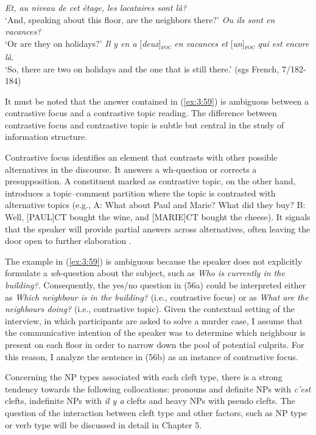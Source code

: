  \ea \label{ex:3:59}
\ea	\textit{Et, au niveau de cet étage, les locataires sont là?}\\
 ‘And, speaking about this floor, are the neighbors there?'
  \textit{Ou ils sont en vacances?}\\
 ‘Or are they on holidays?'
\ex \textit{Il y en a} {[\textit{deux}]\textsubscript{\textsc{foc}}} \normalsize \textit{en vacances et} {[\textit{un}]\textsubscript{\textsc{foc}}}  \textit{qui est encore là}.  \\
‘So, there are two on holidays and the one that is still there.' \hfill (sgs French, 7/182-184)    
\z \z 


It must be noted that the answer contained in (\ref{ex:3:59}) is ambiguous between a contrastive focus and a contrastive topic reading. The difference between contrastive focus and contrastive topic is subtle but central in the study of information structure. 

Contrastive focus identifies an element that contrasts with other possible alternatives in the discourse. It answers a wh-question or corrects a presupposition. A constituent marked as contrastive topic, on the other hand, introduces a topic–comment partition where the topic is contrasted with alternative topics (e.g., A: What about Paul and Marie? What did they buy? B: Well, [PAUL]\tiny{CT} \normalsize bought the wine, and [MARIE]\tiny{CT} \normalsize bought the cheese). It signals that the speaker will provide partial answers across alternatives, often leaving the door open to further elaboration \parencite{krifka2008basic}.

The example in (\ref{ex:3:59}) is ambiguous because the speaker does not explicitly formulate a \textit{wh}-question about the subject, such as \textit{Who is currently in the building?}. Consequently, the yes/no question in (56a) could be interpreted either as \textit{Which neighbour is in the building?} (i.e., contrastive focus) or as \textit{What are the neighbours doing?} (i.e., contrastive topic). Given the contextual setting of the interview, in which participants are asked to solve a murder case, I assume that the communicative intention of the speaker was to determine which neighbour is present on each floor in order to narrow down the pool of potential culprits. For this reason, I analyze the sentence in (56b) as an instance of contrastive focus.
 
Concerning the NP types associated with each cleft type, there is a strong tendency towards the following collocations: pronouns and definite NPs with \textit{c'est} clefts, indefinite NPs with \textit{il y a} clefts and heavy NPs with pseudo clefts. The question of the interaction between cleft type and other factors, such as NP type or verb type will be discussed in detail in Chapter 5.

